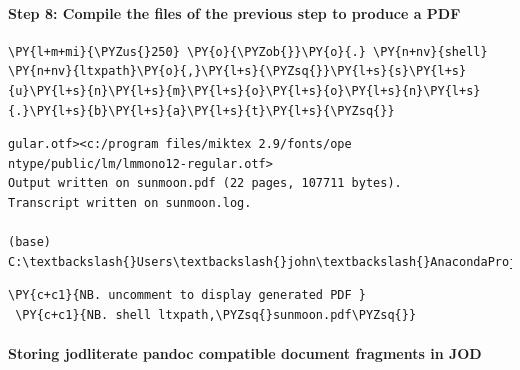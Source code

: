     \hypertarget{step-8-compile-the-files-of-the-previous-step-to-produce-a-pdf}{%
\paragraph{Step 8: Compile the files of the previous step to produce a
PDF}\label{step-8-compile-the-files-of-the-previous-step-to-produce-a-pdf}}

    \begin{tcolorbox}[breakable, size=fbox, boxrule=1pt, pad at break*=1mm,colback=cellbackground, colframe=cellborder]
\begin{Verbatim}[commandchars=\\\{\}]
\PY{l+m+mi}{\PYZus{}250} \PY{o}{\PYZob{}}\PY{o}{.} \PY{n+nv}{shell} \PY{n+nv}{ltxpath}\PY{o}{,}\PY{l+s}{\PYZsq{}}\PY{l+s}{s}\PY{l+s}{u}\PY{l+s}{n}\PY{l+s}{m}\PY{l+s}{o}\PY{l+s}{o}\PY{l+s}{n}\PY{l+s}{.}\PY{l+s}{b}\PY{l+s}{a}\PY{l+s}{t}\PY{l+s}{\PYZsq{}}
\end{Verbatim}
\end{tcolorbox}

    \begin{Verbatim}[commandchars=\\\{\}]
gular.otf><c:/program files/miktex 2.9/fonts/ope
ntype/public/lm/lmmono12-regular.otf>
Output written on sunmoon.pdf (22 pages, 107711 bytes).
Transcript written on sunmoon.log.

(base) C:\textbackslash{}Users\textbackslash{}john\textbackslash{}AnacondaProjects\textbackslash{}testfolder\textbackslash{}grplit>endlocal

    \end{Verbatim}

    \begin{tcolorbox}[breakable, size=fbox, boxrule=1pt, pad at break*=1mm,colback=cellbackground, colframe=cellborder]
\begin{Verbatim}[commandchars=\\\{\}]
\PY{c+c1}{NB. uncomment to display generated PDF }
 \PY{c+c1}{NB. shell ltxpath,\PYZsq{}sunmoon.pdf\PYZsq{}}
\end{Verbatim}
\end{tcolorbox}

    \hypertarget{storing-jodliterate-pandoc-compatible-document-fragments-in-jod}{%
\paragraph{Storing jodliterate pandoc compatible document fragments in
JOD}\label{storing-jodliterate-pandoc-compatible-document-fragments-in-jod}}

